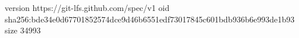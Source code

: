 version https://git-lfs.github.com/spec/v1
oid sha256:bde34e0d67701852574dce9d46b6551edf73017845c601bdb936b6e993de1b93
size 34993
